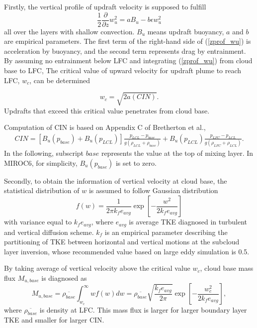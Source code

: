 Firstly, the vertical profile of updraft velocity is supposed to fulfill
\begin{equation}\label{zprof_wu}
    \frac{1}{2}\frac{\partial}{\partial z}w_u^2=aB_u-b\epsilon w_u^2
\end{equation}
all over the layers with shallow convection. $B_u$ means updraft buoyancy, $a$ and $b$ are empirical parameters.
The first term of the right-hand side of (\ref{zprof_wu}) is acceleration by buoyancy, and the second term represents drag by entrainment.
By assuming no entrainment below LFC and integrating (\ref{zprof_wu}) from cloud base to LFC, The critical value of upward velocity for updraft plume to reach LFC, $w_c$, can be determined

\begin{equation}\label{wc}
    w_c = \sqrt{2a(CIN)}.
\end{equation}
Updrafts that exceed this critical value penetrates from cloud base.

Computation of CIN is based on Appendix C of Bretherton et al.,
\begin{align}\label{def_CIN}
    CIN = [B_u(p_{base}) + B_u(p_{LCL})]\frac{p_{LCL}-p_{base}}{g(\rho_{LCL}+\rho_{base})} + B_u(p_{LCL})\frac{p_{LFC}-p_{LCL}}{g(\rho_{LFC}+\rho_{LCL})}.
\end{align}
In the following, subscript $\mathit{base}$ represents the value at the top of mixing layer.
In MIROC6, for simplicity, $B_u(p_{base})$ is set to zero.

Secondly, to obtain the information of vertical velocity at cloud base, the statistical distribution of $w$ is assumed to follow Gaussian distribution
\begin{equation}\label{distr_w}
    f(w) = \frac{1}{2\pi k_f e_{avg}}\exp\left[ -\frac{w^2}{2k_fe_{avg}}\right]
\end{equation}
with variance equal to $k_f e_{avg}$, where $e_{avg}$ is average TKE diagnosed in turbulent and vertical diffusion scheme.
$k_f$ is an empirical parameter describing the partitioning of TKE between horizontal and vertical motions at the subcloud layer inversion, whose recommended value based on large eddy simulation is 0.5.

By taking average of vertical velocity above the critical value $w_c$, cloud base mass flux $M_{u,base}$ is diagnosed as
\begin{equation}\label{Mubase}
    M_{u,base}=\overline{\rho_{base}}\int_{w_c}^{\infty}wf(w)dw =\overline{\rho_{base}}\sqrt{\frac{k_f e_{avg}}{2\pi}}\exp\left[-\frac{w_c^2}{2k_fe_{avg}}\right],
\end{equation}
where $\overline{\rho_{base}}$ is density at LFC.
This mass flux is larger for larger boundary layer TKE and smaller for larger CIN.

